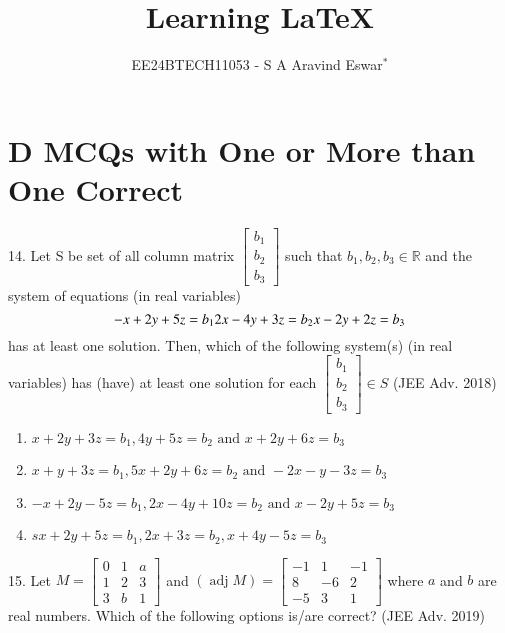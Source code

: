 \documentclass[journal,12pt,twocolumn]{IEEEtran}
\theoremstyle{remark}
\begin{document}

\vspace{3cm}

\title{Learning {\LaTeX}}
\author{EE24BTECH11053 - S A Aravind Eswar$^{*}$}
\maketitle
\newpage
\bigskip

\renewcommand{\thefigure}{\theenumi}
\renewcommand{\thetable}{\theenumi}
\section{D MCQs with One or More than One Correct}
14. Let S be set of all column matrix $\begin{bmatrix}
    b_1\\
    b_2\\
    b_3
\end{bmatrix}$ such that $b_1, b_2, b_3 \in \mathbb{R}$ and the system of equations (in real variables) $$
    -x+2y+5z=b_1\\
    2x-4y+3z=b_2\\
    x-2y+2z=b_3
$$ has at least one solution. Then, which of the following system(s) (in real variables) has (have) at least one solution for each $\begin{bmatrix}
    b_1\\
    b_2\\
    b_3
\end{bmatrix}\in S$ \hfill(JEE Adv. 2018)

\begin{enumerate}
    \item $x+2y+3z=b_1, 4y+5z=b_2 \text{ and }x+2y+6z=b_3$
    \item $x+y+3z=b_1, 5x+2y+6z=b_2\text{ and }-2x-y-3z=b_3$
    \item $-x+2y-5z=b_1,2x-4y+10z=b_2\text{ and }x-2y+5z=b_3$
    \item $sx+2y+5z=b_1,2x+3z=b_2,x+4y-5z=b_3$\\[2pt]
\end{enumerate}

15. Let $M=\begin{bmatrix}
    0 & 1 & a\\
    1 & 2 & 3\\
    3 & b & 1
\end{bmatrix}$ and $(\mathop{adj}M)=\begin{bmatrix}
    -1 & 1 & -1\\
    8 & -6 & 2\\
    -5 & 3 & 1
\end{bmatrix}$ where $a$ and $b$ are real numbers. Which of the following options is/are correct? \hfill (JEE Adv. 2019)
\end{document}
